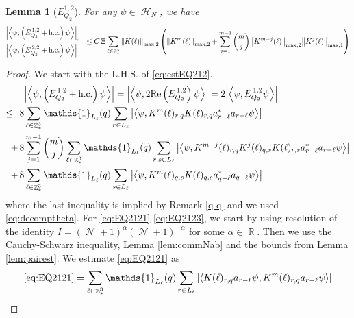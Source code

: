 \documentclass[sn-mathphys, Numbered ,a4paper]{sn-jnl}%
\DeclareMathOperator{\R}{\mathbb{R}}
\DeclareMathOperator{\Z}{\mathbb{Z}}
\DeclareMathOperator{\HH}{\mathcal{H}}
\DeclareMathOperator{\NN}{\mathcal{N}}
\newcommand{\eva}[1]{\left\langle #1 \right\rangle}
\theoremstyle{plain}
\newtheorem{lemma}[theorem]{Lemma}
\theoremstyle{definition}
\theoremstyle{remark}
\theoremstyle{plain}
\theoremstyle{definition}
\theoremstyle{remark}
\begin{document}
\begin{lemma}[$E_{Q_2}^{1,2}$]
    For any $\psi \in \HH_N$, we have
    \begin{alignat}{2}
    	&\begin{aligned}
    		&\abs{\eva{\psi,\left(E^{\,1,2}_{Q_2}+\mathrm{h.c.}\right) \psi }}_,\\ &\abs{\eva{\psi,\left(E^{\,2,2}_{Q_2}+\mathrm{h.c.}\right) \psi }}
    	\end{aligned}
   	&\leq   C\,\Xi \sum\limits_{\ell \in \Z^3_*} \norm{K(\ell)}_{\mathrm{max,2}} \left(\norm{K^m(\ell)}_{\mathrm{max,2}} + \sum\limits_{j=1}^{m-1} {{m}\choose j} \norm{K^{m-j}(\ell)}_{\mathrm{max,2}} \norm{K^j(\ell)}_{\mathrm{max,1}}\right) \label{eq:estEQ212}
    \end{alignat}
\end{lemma}
\begin{proof}
     We start with the L.H.S. of \eqref{eq:estEQ212}.
    \begin{align}
    	&\abs{\eva{\psi,\left(E^{\,1,2}_{Q_2}+\mathrm{h.c.}\right) \psi }} = \abs{\eva{\psi,2\mathrm{Re}\left(E^{\,1,2}_{Q_2}\right) \psi }} = 2\abs{\eva{\psi, E^{\,1,2}_{Q_2} \psi }}\nonumber\\
    	\leq\,\;8& \sum\limits_{\ell\in \Z^3_*} \mathds{1}_{L_{\ell}}(q) \sum\limits_{r\in L_{\ell}} \abs{\eva{\psi, K^m(\ell)_{r,q} K(\ell)_{r,q} a^*_{r-\ell} a_{r-\ell} \psi }}\label{eq:EQ2121}\\
    	+\,8& \sum\limits_{j=1}^{m-1} {{m}\choose j} \sum\limits_{\ell \in \Z^3_*}\mathds{1}_{L_{\ell}}(q) \sum\limits_{r,s\in L_{\ell}}  \abs{\eva{\psi, K^{m-j}(\ell)_{r,q} K^{j}(\ell)_{q,s} K(\ell)_{r,s} a^*_{r-\ell} a_{r-\ell} \psi }} \label{eq:EQ2122}\\
    	+\,8&\sum\limits_{\ell \in \Z^3_*} \mathds{1}_{L_{\ell}}(q) \sum\limits_{ s \in L_{\ell}} \abs{\eva{\psi, K^m(\ell)_{q,s} K(\ell)_{q,s} a^*_{q-\ell} a_{q-\ell} \psi }}\label{eq:EQ2123}
    \end{align}
    where the last inequality is implied by Remark \ref{q-q} and we used \eqref{eq:decomptheta}.
    For \eqref{eq:EQ2121}-\eqref{eq:EQ2123}, we start by using resolution of the identity $I = (\NN+1)^{\alpha}(\NN+1)^{-\alpha}$ for some $\alpha \in \R$. Then we use the Cauchy-Schwarz inequality, Lemma \ref{lem:commNab} and the bounds from Lemma \ref{lem:pairest}.
    We estimate \eqref{eq:EQ2121} as 
\begin{align}
    \eqref{eq:EQ2121}
    &= \sum\limits_{\ell \in \Z^3_*} \mathds{1}_{L_{\ell}}(q) \sum\limits_{r\in L_{\ell}} \abs{\eva{ K(\ell)_{r,q} a_{r-\ell} \psi, K^m(\ell)_{r,q}  a_{r-\ell} \psi }}\nonumber\\

\end{align}
\end{proof}
\end{document}
